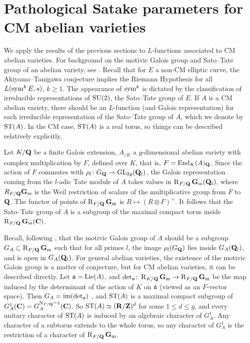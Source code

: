 \section{Pathological Satake parameters for CM abelian varieties}

We apply the results of the previous sections to $L$-functions associated to 
CM abelian varieties. For background on the motivic Galois group and Sato--Tate 
group of an abelian variety, see \cite{serre-tate-1968,serre-1994,yu-2015}. 
Recall that for $E$ a non-CM elliptic curve, the 
Akiyama--Tanigawa conjecture implies the Riemann Hypothesis for all 
$L(\operatorname{sym}^k E,s)$, $k\geqslant 1$. The appearance of $\operatorname{sym}^k$ is dictated by the 
classification of irreducible representations of $\operatorname{SU}(2)$, the Sato--Tate group 
of $E$. If $A$ is a CM abelian variety, there should be an $L$-function (and 
Galois representation) for each irreducible representation of the Sato--Tate 
group of $A$, which we denote by $\mathrm{ST}(A)$. In the 
CM case, $\mathrm{ST}(A)$ is a real torus, so things can be described relatively 
explicitly. 

Let $K/\mathbf{Q}$ be a finite Galois extension, $A_{/K}$ a $g$-dimensional abelian 
variety with complex multiplication by $F$, defined over $K$, that is, 
$F = \operatorname{End}_K(A)_{\mathbf{Q}}$. Since the action of $F$ commutes with 
$\rho_l\colon G_{\mathbf{Q}} \to \operatorname{GL}_{2g}(\mathbf{Q}_l)$, the Galois representation coming 
from the $l$-adic Tate module of $A$ takes values in $\operatorname{R}_{F/\mathbf{Q}}\mathbf{G}_\mathrm{m}(\mathbf{Q}_l)$, 
where $R_{F/\mathbf{Q}} \mathbf{G}_\mathrm{m}$ is the Weil restriction of scalars of the multiplicative 
group from $F$ to $\mathbf{Q}$. The functor of points of $\operatorname{R}_{F/\mathbf{Q}}\mathbf{G}_\mathrm{m}$ is 
$R\mapsto (R\otimes F)^\times$. It follows that the Sato--Tate group of $A$ is 
a subgroup of the maximal compact torus inside $\operatorname{R}_{F/\mathbf{Q}}\mathbf{G}_\mathrm{m}(\mathbf{C})$. 

Recall, following \cite{serre-1994}, that the motivic Galois group of $A$ 
should be a subgroup $G_A\subset \operatorname{R}_{F/\mathbf{Q}}\mathbf{G}_\mathrm{m}$ such that for all primes $l$, 
the image $\rho_l(G_{\mathbf{Q}})$ lies inside $G_A(\mathbf{Q}_l)$, and is open in 
$G_A(\mathbf{Q}_l)$. For general abelian varieties, the existence of the motivic 
Galois group is a matter of conjecture, but for CM abelian varieties, it can be 
described directly. Let $\mathfrak{a}=\operatorname{Lie}(A)$, and 
$\det_{\mathfrak{a}}\colon \operatorname{R}_{K/\mathbf{Q}}\mathbf{G}_\mathrm{m} \to \operatorname{R}_{F/\mathbf{Q}}\mathbf{G}_\mathrm{m}$ be the map induced by the 
determinant of the action of $K$ on $\mathfrak{a}$ (viewed as an $F$-vector space). Then 
$G_A = \operatorname{im}(\det_{\mathfrak{a}})$ \cite{yu-2015}, and $\mathrm{ST}(A)$ is a maximal compact 
subgroup of $G_A^1(\mathbf{C}) = G_A^{\operatorname{N}_{F/\mathbf{Q}} = 1}(\mathbf{C})$. So 
$\mathrm{ST}(A) \simeq (\mathbf{R}/\mathbf{Z})^d$ for some $1\leqslant d \leqslant g$, and every 
unitary character of $\mathrm{ST}(A)$ is induced by an algebraic character of 
$G_A^1$. Any character of a subtorus extends to the whole torus, so any 
character of $G_A^1$ is the restriction of a character of $\operatorname{R}_{F/\mathbf{Q}}\mathbf{G}_\mathrm{m}$. 

